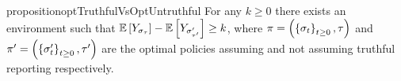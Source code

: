 \begin{restatable}{proposition}{optTruthfulVsOptUntruthful}
    \label{prop:opt-truthful-vs-opt-untruthful}
    For any $k\geq 0$ there exists an environment such that  
    \(
        \mathbb{E}\left[
            Y_{
                \sigma_{
                    \tau
                }
            }
        \right]
        -
        \mathbb{E}\left[
            Y_{
                \sigma'_{
                    \tau'
                }
            }
        \right]
        \geq k
    \),
    where 
    \(
        \pi
        =
        \left(
            \left\{
                \sigma_{t}
            \right\}_{t\geq 0},
            \tau
        \right)
    \)
    and 
    \(
        \pi'
        =
        \left(
            \left\{
            \sigma'_{t}
            \right\}_{t\geq 0},
            \tau'
        \right)
    \)
    are the optimal policies assuming and not assuming truthful reporting respectively.
\end{restatable}  
